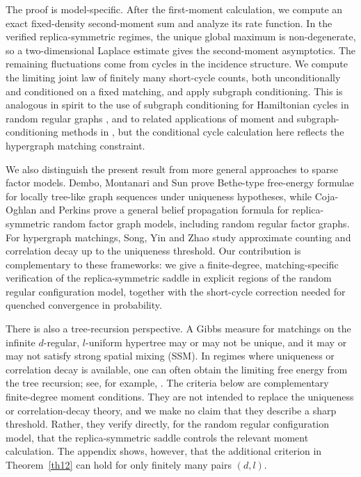 \documentclass[11pt]{amsart}
\theoremstyle{plain}
\numberwithin{equation}{section}
\numberwithin{theorem}{section}
\numberwithin{figure}{section}
\begin{document}
The proof is model-specific.  After the first-moment calculation, we compute an
exact fixed-density second-moment sum and analyze its rate function.  In the
verified replica-symmetric regimes, the unique global maximum is non-degenerate,
so a two-dimensional Laplace estimate gives the second-moment asymptotics.  The
remaining fluctuations come from cycles in the incidence structure.  We compute
the limiting joint law of finitely many short-cycle counts, both unconditionally
and conditioned on a fixed matching, and apply subgraph conditioning.  This is
analogous in spirit to the use of subgraph conditioning for Hamiltonian cycles in
random regular graphs \cite{RW94}, and to related applications of moment and
subgraph-conditioning methods in \cite{AM06,AN05,GSV16}, but the conditional
cycle calculation here reflects the hypergraph matching constraint.

We also distinguish the present result from more general approaches to sparse
factor models.  Dembo, Montanari and Sun \cite{DMS13Factor} prove Bethe-type
free-energy formulae for locally tree-like graph sequences under uniqueness
hypotheses, while Coja-Oghlan and Perkins \cite{COP18} prove a general belief
propagation formula for replica-symmetric random factor graph models, including
random regular factor graphs.  For hypergraph matchings, Song, Yin and Zhao
\cite{SYZ19} study approximate counting and correlation decay up to the
uniqueness threshold.  Our contribution is complementary to these frameworks:
we give a finite-degree, matching-specific verification of the
replica-symmetric saddle in explicit regions of the random regular configuration
model, together with the short-cycle correction needed for quenched convergence
in probability.

There is also a tree-recursion perspective.  A Gibbs measure for matchings on the
infinite $d$-regular, $l$-uniform hypertree may or may not be unique, and it may
or may not satisfy strong spatial mixing (SSM).  In regimes where uniqueness or
correlation decay is available, one can often obtain the limiting free energy
from the tree recursion; see, for example, \cite{DW06,LL13,BST16,CZ12,BGS19}.
The criteria below are complementary finite-degree moment conditions.  They are
not intended to replace the uniqueness or correlation-decay theory, and we make
no claim that they describe a sharp threshold.  Rather, they verify directly, for
the random regular configuration model, that the replica-symmetric saddle controls
the relevant moment calculation.  The appendix shows, however, that the additional
criterion in Theorem~\ref{th12} can hold for only finitely many pairs $(d,l)$.
\end{document}
